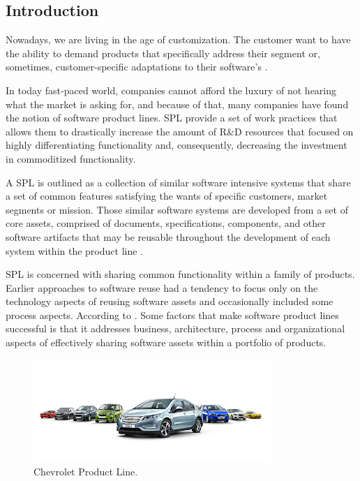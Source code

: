 \subsection{Introduction}
Nowadays, we are living in the age of customization. The customer want to have the ability to demand products that specifically address their segment or, sometimes, customer-specific adaptations to their software's \citep{rafael2013systems}.  

In today fast-paced world, companies cannot afford the luxury of not hearing what the market is asking for, and because of that, many companies have found the notion of software product lines. \acf{SPL} provide a set of work practices that allows them to drastically increase the amount of R\&D resources that focused on highly differentiating functionality and, consequently, decreasing the investment in commoditized functionality. 

A \ac{SPL} is outlined as a collection of similar software intensive systems that share a set of common features satisfying the wants of specific customers, market segments or mission. Those similar software systems are developed from a set of core assets, comprised of documents, specifications, components, and other software artifacts that may be reusable throughout the development of each system within the product line \citep{rafael2013systems}.

 \acf{SPL} is concerned with sharing common functionality within a family of products. Earlier approaches to software reuse had a tendency to focus only on the technology aspects of reusing software assets and occasionally included some process aspects. According to \citep{rafael2013systems}. Some factors that make software product lines successful is that it addresses business, architecture, process and organizational aspects of effectively sharing software assets within a portfolio of products. 


\begin{figure}[htp]
\begin{center}
  \includegraphics[width=9cm]{chapters/background/img/chev-line.jpg}
  \caption[Chevrolet Product Line]{Chevrolet Product Line.}
  \label{fg:chev-line}
\end{center}
\end{figure}


